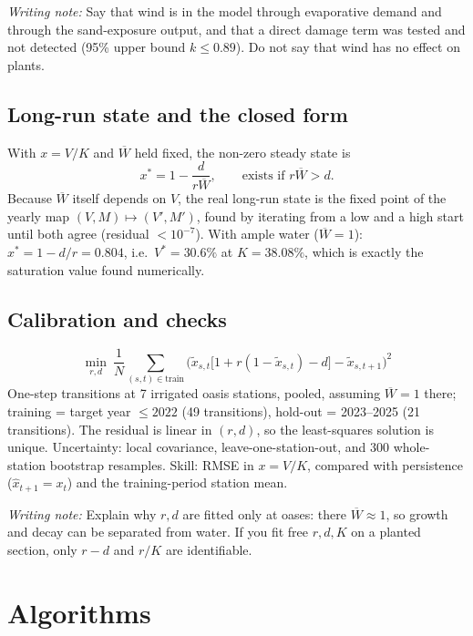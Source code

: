 \documentclass[11pt,a4paper]{article}
\newcommand{\Wb}{\overline W}
\newcommand{\say}[1]{\par\smallskip\noindent\textcolor{teal!70!black}{\textit{Writing note:} #1}\par\smallskip}
\begin{document}
\say{Say that wind is in the model through evaporative demand and through the sand-exposure output, and that
a direct damage term was tested and not detected (95\% upper bound $k\le0.89$). Do not say that wind has no
effect on plants.}

\subsection{Long-run state and the closed form}
With $x=V/K$ and $\Wb$ held fixed, the non-zero steady state is
\begin{equation}\label{eq:xstar}
x^*=1-\frac{d}{r\Wb},\qquad\text{exists if } r\Wb>d.
\end{equation}
Because $\Wb$ itself depends on $V$, the real long-run state is the fixed point of the yearly map
$(V,M)\mapsto(V',M')$, found by iterating from a low and a high start until both agree
(residual $<10^{-7}$). With ample water ($\Wb=1$): $x^*=1-d/r=0.804$, i.e.\ $V^*=30.6\%$
at $K=38.08\%$, which is exactly the saturation value found numerically.

\subsection{Calibration and checks}
\begin{equation}\label{eq:obj}
\min_{r,d}\ \frac1N\sum_{(s,t)\in\text{train}}\Big(\tilde x_{s,t}\big[1+r(1-\tilde x_{s,t})-d\big]-\tilde x_{s,t+1}\Big)^2
\end{equation}
One-step transitions at 7 irrigated oasis stations, pooled, assuming $\Wb=1$ there;
training = target year $\le2022$ (49 transitions), hold-out = 2023--2025 (21 transitions).
The residual is linear in $(r,d)$, so the least-squares solution is unique.
Uncertainty: local covariance, leave-one-station-out, and 300 whole-station bootstrap resamples.
Skill: RMSE in $x=V/K$, compared with persistence ($\hat x_{t+1}=x_t$) and the training-period station mean.

\say{Explain why $r,d$ are fitted only at oases: there $\Wb\approx1$, so growth and decay can be
separated from water. If you fit free $r,d,K$ on a planted section, only $r-d$ and $r/K$ are identifiable.}

\section{Algorithms}\label{sec:alg}
\end{document}
